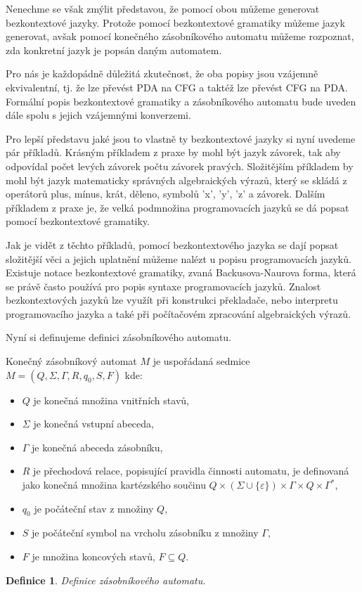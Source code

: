 Nenechme se však zmýlit představou, že pomocí obou můžeme generovat bezkontextové jazyky. Protože pomocí bezkontextové gramatiky můžeme jazyk generovat, avšak pomocí konečného zásobníkového automatu můžeme rozpoznat, zda konkretní jazyk je popsán daným automatem. 

Pro nás je každopádně důležitá zkutečnost, že oba popisy jsou vzájemně ekvivalentní, tj. že lze převést PDA na CFG a taktéž lze převést CFG na PDA. Formální popis bezkontextové gramatiky a zásobníkového automatu bude uveden dále spolu s jejich vzájemnými konverzemi. 

Pro lepší představu jaké jsou to vlastně ty bezkontextové jazyky si nyní uvedeme pár příkladů. Krásným příkladem z praxe by mohl být jazyk závorek, tak aby odpovídal počet levých závorek počtu závorek pravých. Složitějším příkladem by mohl být jazyk matematicky správných algebraických výrazů, který se skládá z operátorů plus, mínus, krát, děleno, symbolů 'x', 'y', 'z' a závorek. Dalším příkladem z praxe je, že velká podmnožina programovacích jazyků se dá popsat pomocí bezkontextové gramatiky. 

Jak je vidět z těchto příkladů, pomocí bezkontextového jazyka se dají popsat složitější věci a jejich uplatnění můžeme nalézt u popisu programovacích jazyků. Existuje notace bezkontextové gramatiky, zvaná Backusova-Naurova forma, která se právě často používá pro popis syntaxe programovacích jazyků. Znalost bezkontextových jazyků lze využít při konstrukci překladače, nebo interpretu programovacího jazyka a také při počítačovém zpracování algebraických výrazů. \cite{CFL}

\newtheorem{mydef}{Definice}
\newtheorem{myAlgorithm}{Algoritmus}

Nyní si definujeme definici zásobníkového automatu. \cite{PDA}

\begin{framed}
	\begin{flushleft}Konečný zásobníkový automat \( M \) je uspořádaná sedmice \( M = (Q, \Sigma, \Gamma, R, q_0, S, F) \) kde:\end{flushleft}
	\begin{itemize}
		\item \( Q \) je konečná množina vnitřních stavů,
		\item \( \Sigma \) je konečná vstupní abeceda,
		\item \( \Gamma \) je konečná abeceda zásobníku,
		\item \( R \) je přechodová relace, popisující pravidla činnosti automatu, je definovaná jako konečná množina kartézského součinu \( Q \times (\Sigma \cup \{\varepsilon\} ) \times \Gamma \times Q \times \Gamma^* \),
		\item \( q_0 \) je počáteční stav z množiny \( Q \),
		\item \( S \) je počáteční symbol na vrcholu zásobníku z množiny \( \Gamma \),
		\item \( F \) je množina koncových stavů, \( F \subseteq Q \).
	\end{itemize}
\end{framed}
\begin{mydef}
	Definice zásobníkového automatu.
\end{mydef}

